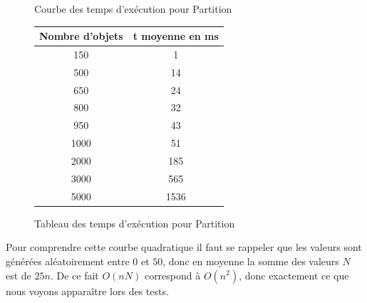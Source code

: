 \begin{figure}[ht]
\begin{minipage}[b]{0.5\linewidth}
\centering
{}
\caption {Courbe des temps d'exécution pour Partition}
\label{partition_courbe}
\end{minipage}
\hspace{0.5cm}
\begin{minipage}[b]{0.5\linewidth}
\centering
\begin{tabular}[scale=0.9]{|c|c|}
\hline
Nombre d'objets & t moyenne en ms\\
\hline
150 & 1\\
\hline
500 & 14\\
\hline
650 & 24\\
\hline
800 & 32\\
\hline
950 & 43\\
\hline
1000 & 51\\
\hline
2000 & 185\\
\hline
3000 & 565\\
\hline
5000 & 1536\\
\hline
\end{tabular}
\caption {Tableau des temps d'exécution pour Partition}
\label{partition_table}
\end{minipage}
\end{figure}

Pour comprendre cette courbe quadratique il faut se rappeler que les
valeurs sont générées aléatoirement entre $0$ et $50$, donc en moyenne
la somme des valeurs $N$ est de $25n$. De ce fait $O(nN)$ correspond à
$O(n^2)$, donc exactement ce que nous voyons apparaître lors des
tests.
